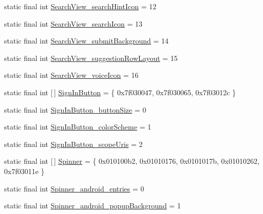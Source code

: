 \begin{DoxyCompactItemize}
static final int \mbox{\hyperlink{classcom_1_1google_1_1android_1_1gms_1_1R_1_1styleable_a945e18c07f7ea7f540de5fe6ef905a14}{Search\+View\+\_\+search\+Hint\+Icon}} = 12
\item 
static final int \mbox{\hyperlink{classcom_1_1google_1_1android_1_1gms_1_1R_1_1styleable_a9f8798697c2e29bfe5c876a1fc2d00c6}{Search\+View\+\_\+search\+Icon}} = 13
\item 
static final int \mbox{\hyperlink{classcom_1_1google_1_1android_1_1gms_1_1R_1_1styleable_ab5b8508a6e410165aacde0ab7a28eeb7}{Search\+View\+\_\+submit\+Background}} = 14
\item 
static final int \mbox{\hyperlink{classcom_1_1google_1_1android_1_1gms_1_1R_1_1styleable_ae2af19907a5642c5c3d925be8f338b13}{Search\+View\+\_\+suggestion\+Row\+Layout}} = 15
\item 
static final int \mbox{\hyperlink{classcom_1_1google_1_1android_1_1gms_1_1R_1_1styleable_aaabe34a3f44ae8269bd88a8f7ec21dff}{Search\+View\+\_\+voice\+Icon}} = 16
\item 
static final int \mbox{[}$\,$\mbox{]} \mbox{\hyperlink{classcom_1_1google_1_1android_1_1gms_1_1R_1_1styleable_a9c3e4e0de068fc597e7e644add19f14e}{Sign\+In\+Button}} = \{ 0x7f030047, 0x7f030065, 0x7f03012c \}
\item 
static final int \mbox{\hyperlink{classcom_1_1google_1_1android_1_1gms_1_1R_1_1styleable_a254c9d7fc09997131322957794f3802b}{Sign\+In\+Button\+\_\+button\+Size}} = 0
\item 
static final int \mbox{\hyperlink{classcom_1_1google_1_1android_1_1gms_1_1R_1_1styleable_afaa94dedadfb2cf5531d3f65d7fa3f9f}{Sign\+In\+Button\+\_\+color\+Scheme}} = 1
\item 
static final int \mbox{\hyperlink{classcom_1_1google_1_1android_1_1gms_1_1R_1_1styleable_a49c364dbd46a1ca8f0632faf921de571}{Sign\+In\+Button\+\_\+scope\+Uris}} = 2
\item 
static final int \mbox{[}$\,$\mbox{]} \mbox{\hyperlink{classcom_1_1google_1_1android_1_1gms_1_1R_1_1styleable_a11c992d83e6f57fe4759f4a0c310b97d}{Spinner}} = \{ 0x010100b2, 0x01010176, 0x0101017b, 0x01010262, 0x7f03011e \}
\item 
static final int \mbox{\hyperlink{classcom_1_1google_1_1android_1_1gms_1_1R_1_1styleable_a258c0e59dc8e96e0a5f9884d373194df}{Spinner\+\_\+android\+\_\+entries}} = 0
\item 
static final int \mbox{\hyperlink{classcom_1_1google_1_1android_1_1gms_1_1R_1_1styleable_ab241556f7a2e50851571682d38c5d910}{Spinner\+\_\+android\+\_\+popup\+Background}} = 1

\end{DoxyCompactItemize}
